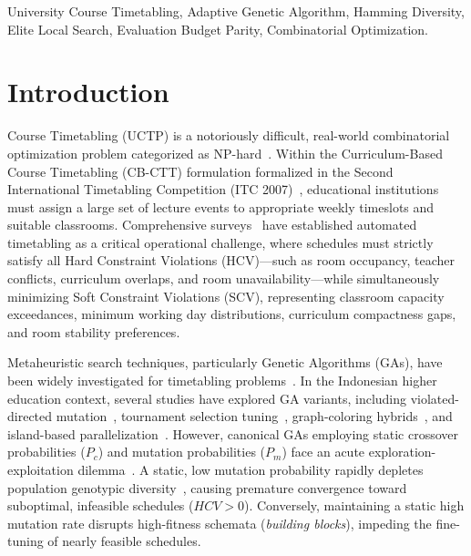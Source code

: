 \documentclass[journal]{IEEEtran}
\begin{document}
\begin{IEEEkeywords}
University Course Timetabling, Adaptive Genetic Algorithm, Hamming Diversity, Elite Local Search, Evaluation Budget Parity, Combinatorial Optimization.
\end{IEEEkeywords}

\section{Introduction}
 Course Timetabling (UCTP) is a notoriously difficult, real-world combinatorial optimization problem categorized as NP-hard~\cite{bettinelli2015survey}. Within the Curriculum-Based Course Timetabling (CB-CTT) formulation formalized in the Second International Timetabling Competition (ITC 2007)~\cite{bonutti2012benchmarking,mccollum2009setting}, educational institutions must assign a large set of lecture events to appropriate weekly timeslots and suitable classrooms. Comprehensive surveys~\cite{chen2021survey,qu2009survey} have established automated timetabling as a critical operational challenge, where schedules must strictly satisfy all Hard Constraint Violations (HCV)---such as room occupancy, teacher conflicts, curriculum overlaps, and room unavailability---while simultaneously minimizing Soft Constraint Violations (SCV), representing classroom capacity exceedances, minimum working day distributions, curriculum compactness gaps, and room stability preferences.

Metaheuristic search techniques, particularly Genetic Algorithms (GAs), have been widely investigated for timetabling problems~\cite{goldberg1989genetic}. In the Indonesian higher education context, several studies have explored GA variants, including violated-directed mutation~\cite{kristiadi2019genetic}, tournament selection tuning~\cite{sari2019optimasi}, graph-coloring hybrids~\cite{hiryanto2011graph}, and island-based parallelization~\cite{fachrie2021paralelisasi,mustika2025penerapan}. However, canonical GAs employing static crossover probabilities ($P_c$) and mutation probabilities ($P_m$) face an acute exploration-exploitation dilemma~\cite{eiben1999parameter,karafotias2015parameter,lacerda2021systematic}. A static, low mutation probability rapidly depletes population genotypic diversity~\cite{sakal2023genotype}, causing premature convergence toward suboptimal, infeasible schedules ($HCV > 0$). Conversely, maintaining a static high mutation rate disrupts high-fitness schemata (\textit{building blocks}), impeding the fine-tuning of nearly feasible schedules.
\end{document}
